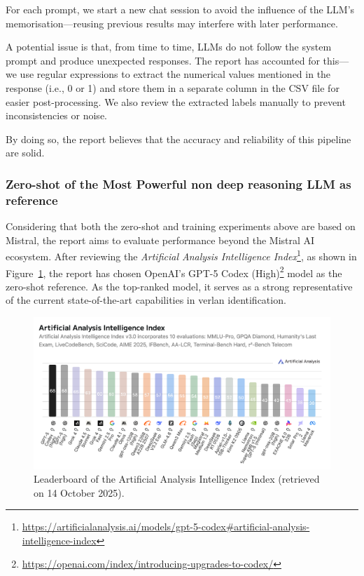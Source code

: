 \documentclass[12pt]{article}
\begin{document}
For each prompt, we start a new chat session to avoid the influence of the LLM's memorisation\;---\;reusing previous results may interfere with later performance.

A potential issue is that, from time to time, LLMs do not follow the system prompt and produce unexpected responses. The report has accounted for this\;---\;we use regular expressions to extract the numerical values mentioned in the response (i.e., 0 or 1) and store them in a separate column in the CSV file for easier post-processing. We also review the extracted labels manually to prevent inconsistencies or noise.

By doing so, the report believes that the accuracy and reliability of this pipeline are solid.

\subsubsection{Zero-shot of the Most Powerful non deep reasoning LLM as reference}

Considering that both the zero-shot and training experiments above are based on Mistral, the report aims to evaluate performance beyond the Mistral AI ecosystem. After reviewing the \textit{Artificial Analysis Intelligence Index}\footnote{\url{https://artificialanalysis.ai/models/gpt-5-codex\#artificial-analysis-intelligence-index}}, as shown in Figure~\ref{fig:AI_Index}, the report has chosen OpenAI's GPT-5 Codex (High)\footnote{\url{https://openai.com/index/introducing-upgrades-to-codex/}} model as the zero-shot reference. As the top-ranked model, it serves as a strong representative of the current state-of-the-art capabilities in verlan identification.

\begin{figure}[H]
\centering
\includegraphics[width=15cm]{figures/Artificial Analysis Intelligence Index (14 Oct '25) .png}
\caption{\label{fig:AI_Index}Leaderboard of the Artificial Analysis Intelligence Index (retrieved on 14 October 2025).}
\end{figure}
\end{document}
